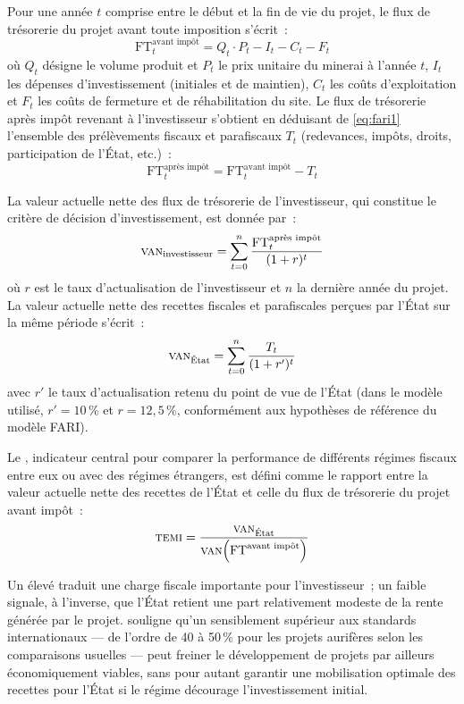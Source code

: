 Pour une année $t$ comprise entre le début et la fin de vie du projet, le flux de trésorerie du projet avant toute imposition s'écrit~:
\begin{equation}
  \mathrm{FT}^{\text{avant impôt}}_t = Q_t \cdot P_t - I_t - C_t - F_t
  \label{eq:fari1}
\end{equation}
où $Q_t$ désigne le volume produit et $P_t$ le prix unitaire du minerai à l'année $t$, $I_t$ les dépenses d'investissement (initiales et de maintien), $C_t$ les coûts d'exploitation et $F_t$ les coûts de fermeture et de réhabilitation du site. Le flux de trésorerie après impôt revenant à l'investisseur s'obtient en déduisant de \eqref{eq:fari1} l'ensemble des prélèvements fiscaux et parafiscaux $T_t$ (redevances, impôts, droits, participation de l'État, etc.)~:
\begin{equation}
  \mathrm{FT}^{\text{après impôt}}_t = \mathrm{FT}^{\text{avant impôt}}_t - T_t
  \label{eq:fari2}
\end{equation}

La valeur actuelle nette des flux de trésorerie de l'investisseur, qui constitue le critère de décision d'investissement, est donnée par~:
\begin{equation}
  \textsc{van}_{\text{investisseur}} = \sum_{t=0}^{n} \frac{\mathrm{FT}^{\text{après impôt}}_t}{(1+r)^t}
  \label{eq:fari3}
\end{equation}
où $r$ est le taux d'actualisation de l'investisseur et $n$ la dernière année du projet. La valeur actuelle nette des recettes fiscales et parafiscales perçues par l'État sur la même période s'écrit~:
\begin{equation}
  \textsc{van}_{\text{État}} = \sum_{t=0}^{n} \frac{T_t}{(1+r')^t}
  \label{eq:fari4}
\end{equation}
avec $r'$ le taux d'actualisation retenu du point de vue de l'État (dans le modèle utilisé, $r'=10\,\%$ et $r=12{,}5\,\%$, conformément aux hypothèses de référence du modèle FARI).

Le \TEMI, indicateur central pour comparer la performance de différents régimes fiscaux entre eux ou avec des régimes étrangers, est défini comme le rapport entre la valeur actuelle nette des recettes de l'État et celle du flux de trésorerie du projet avant impôt~:
\begin{equation}
  \textsc{temi} = \frac{\textsc{van}_{\text{État}}}{\textsc{van}\!\left(\mathrm{FT}^{\text{avant impôt}}\right)}
  \label{eq:fari5}
\end{equation}

Un \TEMI élevé traduit une charge fiscale importante pour l'investisseur~; un \TEMI faible signale, à l'inverse, que l'État retient une part relativement modeste de la rente générée par le projet. \citet{lassourd2018rdc} souligne qu'un \TEMI sensiblement supérieur aux standards internationaux --- de l'ordre de 40 à 50\,\% pour les projets aurifères selon les comparaisons usuelles --- peut freiner le développement de projets par ailleurs économiquement viables, sans pour autant garantir une mobilisation optimale des recettes pour l'État si le régime décourage l'investissement initial.

